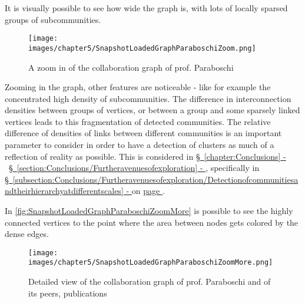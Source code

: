 It is visually possible to see how wide the graph is, with lots of locally sparsed groups of subcommunities.

\begin{figure}[H]%
	\centering%
	\texttt{[image: images/chapter5/SnapshotLoadedGraphParaboschiZoom.png]}%
	\caption[A zoom in of the collaboration graph of prof. Paraboschi]{A zoom in of the collaboration graph of prof. Paraboschi}%
	\label{fig:SnapshotLoadedGraphParaboschiZoom}%
\end{figure}%

Zooming in the graph, other features are noticeable - like for example the concentrated high density of subcommunities.
The difference in interconnection densities between groups of vertices, or between a group and some sparsely linked vertices leads to this fragmentation of detected communities. 
The relative difference of densities of links between different communities is an important parameter to consider in order to have a detection of clusters as much of a reflection of reality as possible.
This is considered in \hyperref[chapter:Conclusions]{\S\ \ref{chapter:Conclusions} - } \  \hyperref[section:Conclusions/Furtheravenuesofexploration]{\S\ \ref{section:Conclusions/Furtheravenuesofexploration} - }, specifically in \hyperref[subsection:Conclusions/Furtheravenuesofexploration/Detectionofcommunitiesandtheirhierarchyatdifferentscales]{\S\ \ref{subsection:Conclusions/Furtheravenuesofexploration/Detectionofcommunitiesandtheirhierarchyatdifferentscales} - } on \hyperref[subsection:Conclusions/Furtheravenuesofexploration/Detectionofcommunitiesandtheirhierarchyatdifferentscales]{page \pageref{subsection:Conclusions/Furtheravenuesofexploration/Detectionofcommunitiesandtheirhierarchyatdifferentscales}}.\label{tobementionedinconclusions/Detectionofcommunitiesandtheirhierarchyatdifferentscales}

In \hyperref[fig:SnapshotLoadedGraphParaboschiZoomMore]{\autoref{fig:SnapshotLoadedGraphParaboschiZoomMore}} is possible to see the highly connected vertices to the point where the area between nodes gets colored by the dense edges.

\begin{figure}[H]%
	\centering%
	\texttt{[image: images/chapter5/SnapshotLoadedGraphParaboschiZoomMore.png]}%
	\caption[Detailed view of the collaboration graph of prof. Paraboschi and of its peers, publications]{Detailed view of the collaboration graph of prof. Paraboschi and of its peers, publications}%
	\label{fig:SnapshotLoadedGraphParaboschiZoomMore}%
\end{figure}%

